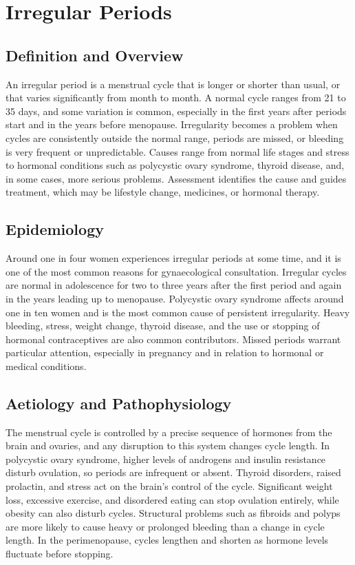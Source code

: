 \chapter{Irregular Periods}

\section*{Definition and Overview}
An irregular period is a menstrual cycle that is longer or shorter than usual, or that varies significantly from month to month. A normal cycle ranges from 21 to 35 days, and some variation is common, especially in the first years after periods start and in the years before menopause. Irregularity becomes a problem when cycles are consistently outside the normal range, periods are missed, or bleeding is very frequent or unpredictable. Causes range from normal life stages and stress to hormonal conditions such as polycystic ovary syndrome, thyroid disease, and, in some cases, more serious problems. Assessment identifies the cause and guides treatment, which may be lifestyle change, medicines, or hormonal therapy.

\section*{Epidemiology}
Around one in four women experiences irregular periods at some time, and it is one of the most common reasons for gynaecological consultation. Irregular cycles are normal in adolescence for two to three years after the first period and again in the years leading up to menopause. Polycystic ovary syndrome affects around one in ten women and is the most common cause of persistent irregularity. Heavy bleeding, stress, weight change, thyroid disease, and the use or stopping of hormonal contraceptives are also common contributors. Missed periods warrant particular attention, especially in pregnancy and in relation to hormonal or medical conditions.

\section*{Aetiology and Pathophysiology}
The menstrual cycle is controlled by a precise sequence of hormones from the brain and ovaries, and any disruption to this system changes cycle length. In polycystic ovary syndrome, higher levels of androgens and insulin resistance disturb ovulation, so periods are infrequent or absent. Thyroid disorders, raised prolactin, and stress act on the brain's control of the cycle. Significant weight loss, excessive exercise, and disordered eating can stop ovulation entirely, while obesity can also disturb cycles. Structural problems such as fibroids and polyps are more likely to cause heavy or prolonged bleeding than a change in cycle length. In the perimenopause, cycles lengthen and shorten as hormone levels fluctuate before stopping.

